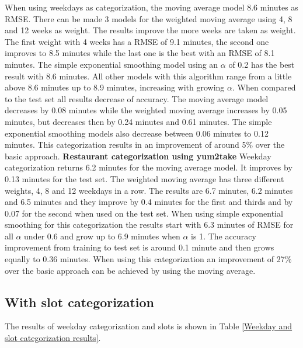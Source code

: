 When using weekdays as categorization, the moving average model 8.6 minutes as RMSE. There can be made 3 models for the weighted moving average using 4, 8 and 12 weeks as weight. The results improve the more weeks are taken as weight. The first weight with 4 weeks has a RMSE of 9.1 minutes, the second one improves to 8.5 minutes while the last one is the best with an RMSE of 8.1 minutes. The simple exponential smoothing model using an $\alpha$ of 0.2 has the best result with 8.6 minutes. All other models with this algorithm range from a little above 8.6 minutes up to 8.9 minutes, increasing with growing $\alpha$. When compared to the test set all results decrease of accuracy. The moving average model decreases by 0.08 minutes while the weighted moving average increases by 0.05 minutes, but decreases then by 0.24 minutes and 0.61 minutes. The simple exponential smoothing models also decrease between 0.06 minutes to 0.12 minutes.\newline
This categorization results in an improvement of around 5\% over the basic approach.
\newline\newline\textbf{Restaurant categorization using yum2take}\newline
Weekday categorization returns 6.2 minutes for the moving average model. It improves by 0.13 minutes for the test set. The weighted moving average has three different weights, 4, 8 and 12 weekdays in a row. The results are 6.7 minutes, 6.2 minutes and 6.5 minutes and they improve by 0.4 minutes for the first and thirds and by 0.07 for the second when used on the test set. When using simple exponential smoothing for this categorization the results start with 6.3 minutes of RMSE for all $\alpha$ under 0.6 and grow up to 6.9 minutes when $\alpha$ is 1. The accuracy improvement from training to test set is around 0.1 minute and then grows equally to 0.36 minutes.\newline
When using this categorization an improvement of 27\% over the basic approach can be achieved by using the moving average.
\subsection{With slot categorization}
The results of weekday categorization and slots is shown in Table \ref{Weekday and slot categorization results}.


